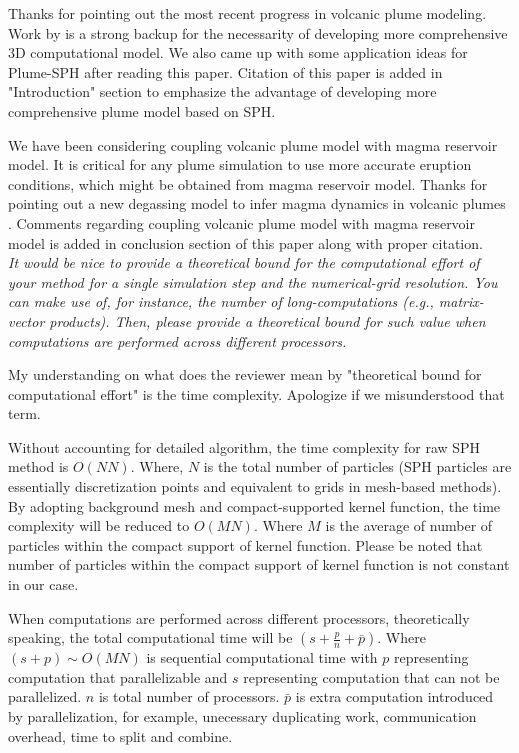 \documentclass[10pt,a4paper]{article}
\begin{document}
Thanks for pointing out the most recent progress in volcanic plume modeling. 
Work by \citet{costa2018understanding} is a strong backup for the necessarity of developing more comprehensive 3D computational model. We also came up with some application ideas for Plume-SPH after reading this paper. Citation of this paper is added in "Introduction" section to emphasize the advantage of developing more comprehensive plume model based on SPH.

We have been considering coupling volcanic plume model with magma reservoir model. It is critical for any plume simulation to use more accurate eruption conditions, which might be obtained from magma reservoir model. Thanks for pointing out a new degassing model to infer magma dynamics in volcanic plumes \cite{terray2018new}. Comments regarding coupling volcanic plume model with magma reservoir model is added in conclusion section of this paper along with proper citation.
\\[3pt]

\textit{It would be nice to provide a theoretical bound for the computational effort of your method for a single simulation step and the numerical-grid resolution. You can make use of, for instance, the number of long-computations (e.g., matrix- vector products). Then, please provide a theoretical bound for such value when computations are performed across different processors.
}

My understanding on what does the reviewer mean by "theoretical bound for computational effort" is the time complexity. Apologize if we misunderstood that term. 

Without accounting for detailed algorithm, the time complexity for raw SPH method is $O(NN)$. Where, $N$ is the total number of particles (SPH particles are essentially discretization points and equivalent to grids in mesh-based methods). By adopting background mesh and compact-supported kernel function, the time complexity will be reduced to $O(MN)$. Where $M$ is the average of number of particles within the compact support of kernel function. Please be noted that number of particles within the compact support of kernel function is not constant in our case. 

When computations are performed across different processors, theoretically speaking, the total computational time will be $(s+\frac{p}{n}+\bar{p})$. Where $(s+p)\sim O(MN)$ is sequential computational time with $p$ representing computation that parallelizable and $s$ representing computation that can not be parallelized. $n$ is total number of processors. $\bar{p}$ is extra computation introduced by parallelization, for example, 
unecessary duplicating work, communication overhead, time to split and combine.
\end{document}
